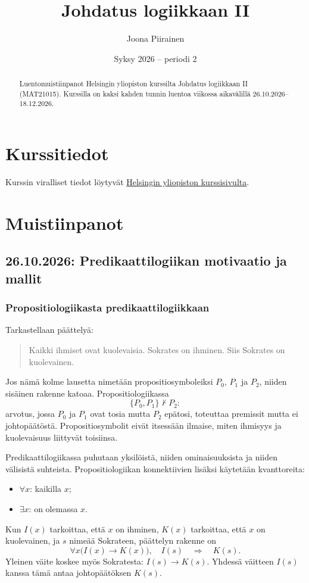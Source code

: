 \documentclass[11pt,a4paper]{amsart}
\title{Johdatus logiikkaan II}
\author{Joona Piirainen}
\date{Syksy 2026 -- periodi 2}
\begin{document}
\begin{abstract}
  Luentomuistiinpanot Helsingin yliopiston kurssilta Johdatus logiikkaan II
  (MAT21015). Kurssilla on kaksi kahden tunnin luentoa viikossa aikavälillä
  26.10.2026--18.12.2026.
\end{abstract}

\maketitle

\tableofcontents

\section{Kurssitiedot}

Kurssin viralliset tiedot löytyvät
\href{https://studies.helsinki.fi/kurssit/opintojakso/otm-52c850ab-c78b-491d-86ab-14a4865e2850/MAT21015?cpId=hy-lv-77}{Helsingin
yliopiston kurssisivulta}.

\section{Muistiinpanot}

\subsection{26.10.2026: Predikaattilogiikan motivaatio ja mallit}

\subsubsection{Propositiologiikasta predikaattilogiikkaan}

Tarkastellaan päättelyä:
\begin{quote}
  Kaikki ihmiset ovat kuolevaisia. Sokrates on ihminen.
  Siis Sokrates on kuolevainen.
\end{quote}
Jos nämä kolme lausetta nimetään propositiosymboleiksi $P_0$, $P_1$ ja
$P_2$, niiden sisäinen rakenne katoaa. Propositiologiikassa
\[
  \{P_0,P_1\}\nvdash P_2:
\]
arvotus, jossa $P_0$ ja $P_1$ ovat tosia mutta $P_2$ epätosi, toteuttaa
premissit mutta ei johtopäätöstä. Propositiosymbolit eivät itsessään
ilmaise, miten ihmisyys ja kuolevaisuus liittyvät toisiinsa.

Predikaattilogiikassa puhutaan yksilöistä, niiden ominaisuuksista ja
niiden välisistä suhteista. Propositiologiikan konnektiivien lisäksi
käytetään kvanttoreita:
\begin{itemize}
  \item $\forall x$: kaikilla $x$;
  \item $\exists x$: on olemassa $x$.
\end{itemize}
Kun $I(x)$ tarkoittaa, että $x$ on ihminen, $K(x)$ tarkoittaa, että $x$
on kuolevainen, ja $s$ nimeää Sokrateen, päättelyn rakenne on
\[
  \forall x\bigl(I(x)\to K(x)\bigr),\quad I(s)
  \quad\Longrightarrow\quad K(s).
\]
Yleinen väite koskee myös Sokratesta: $I(s)\to K(s)$. Yhdessä väitteen
$I(s)$ kanssa tämä antaa johtopäätöksen $K(s)$.
\end{document}

